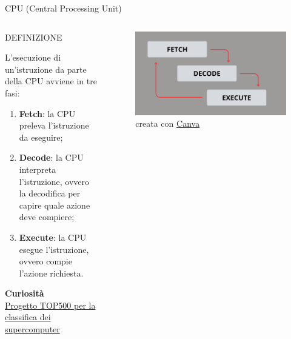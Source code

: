 \documentclass[aspectratio=1610]{beamer}
\begin{document}
\begin{frame}{CPU (Central Processing Unit)}
    \begin{columns}
            \begin{alertblock}{DEFINIZIONE}
                \begin{minipage}{0.96\linewidth}
                    \justifying
                    L'esecuzione di un'istruzione da parte della CPU avviene in tre fasi:
                    \begin{enumerate}
                        \justifying
                        \pause
                        \item \textbf{Fetch}: la CPU preleva l'istruzione da eseguire;
                        \pause
                        \item \textbf{Decode}: la CPU interpreta l'istruzione, ovvero la decodifica per capire quale azione deve compiere;
                        \pause
                        \item \textbf{Execute}: la CPU esegue l'istruzione, ovvero compie l'azione richiesta.
                    \end{enumerate}
                    \bigskip
                    \tiny{\textbf{Curiosità}}\\
                    \tiny{\href{https://www.top500.org/}{Progetto TOP500 per la classifica dei supercomputer}}
                \end{minipage}
            \end{alertblock}
            \begin{figure}
                \includegraphics[width=\linewidth]{img/fde.png}
                \caption{{creata con \href{https://www.canva.com}{Canva}}}
            \end{figure}
    \end{columns}
\end{frame}
\end{document}
